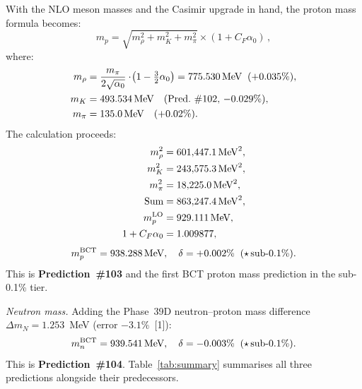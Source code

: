 \documentclass[10pt,twocolumn]{article}
\begin{document}
With the NLO meson masses and the Casimir upgrade in hand, the proton mass formula becomes:
\begin{equation}
m_p = \sqrt{m_\rho^2 + m_K^2 + m_\pi^2}\times(1+C_F\alpha_0)\,,
\label{eq:mp}
\end{equation}
where:
\begin{align}
m_\rho &= \frac{m_\pi}{2\sqrt{\alpha_0}}\cdot\!\left(1-\tfrac{3}{2}\alpha_0\right)
         = 775.530\,\text{MeV}\;\;(+0.035\%), \notag\\
m_K    &= 493.534\,\text{MeV}\quad\text{(Pred.~\#102, $-0.029\%$),} \notag\\
m_\pi  &= 135.0\,\text{MeV}\quad(+0.02\%). \notag
\end{align}
The calculation proceeds:
\begin{align}
m_\rho^2 &= 601{,}447.1\,\text{MeV}^2, \notag\\
m_K^2    &= 243{,}575.3\,\text{MeV}^2, \notag\\
m_\pi^2  &= 18{,}225.0\,\text{MeV}^2,  \notag\\
\text{Sum} &= 863{,}247.4\,\text{MeV}^2, \label{eq:sum}\\
m_p^{\rm LO} &= 929.111\,\text{MeV}, \notag\\
1+C_F\alpha_0 &= 1.009877, \notag
\end{align}
\begin{equation}
m_p^{\rm BCT} = 938.288\,\text{MeV},\quad
\delta = +0.002\%\;\;(\star\,\text{sub-0.1\%}).
\label{eq:mpresult}
\end{equation}
This is \textbf{Prediction~\#103} and the first BCT proton mass prediction in the sub-0.1\%
tier.

\textit{Neutron mass.} Adding the Phase~39D neutron--proton mass difference
$\Delta m_N = 1.253$~MeV (error $-3.1\%$~[1]):
\begin{equation}
m_n^{\rm BCT} = 939.541\,\text{MeV},\quad
\delta = -0.003\%\;\;(\star\,\text{sub-0.1\%}).
\label{eq:mnresult}
\end{equation}
This is \textbf{Prediction~\#104}. Table~\ref{tab:summary} summarises all three predictions
alongside their predecessors.
\end{document}
